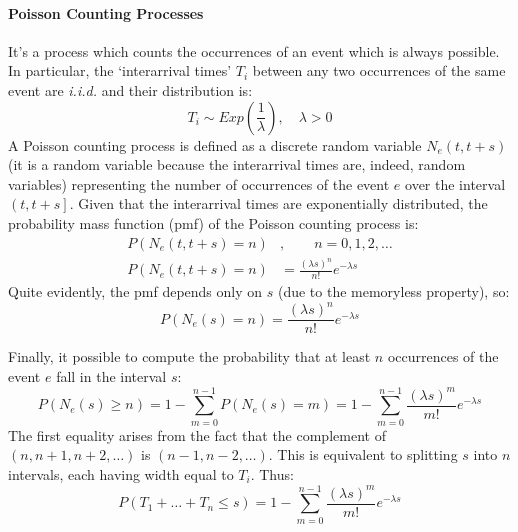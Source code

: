 \documentclass[12pt,a4paper]{article}
\begin{document}
\paragraph{Poisson Counting Processes} It's a process which counts the occurrences of an event which is always possible. In particular, the `interarrival times' $T_i$ between any two occurrences of the same event are \textit{i.i.d.} and their distribution is:
$$
T_i\sim Exp\left(\frac{1}{\lambda}\right), \quad \lambda > 0
$$
\noindent
A Poisson counting process is defined as a discrete random variable $N_e(t,t+s)$ (it is a random variable because the interarrival times are, indeed, random variables) representing the number of occurrences of the event $e$ over the interval $\left( t,t+s\right]$. Given that the interarrival times are exponentially distributed, the probability mass function (pmf) of the Poisson counting process is:
\begin{equation*}
\begin{split}
P\left(N_e(t,t+s)=n\right)&, \qquad n = 0,1,2,\dots \\
P\left(N_e(t,t+s)=n\right)& = \frac{(\lambda s)^n}{n!}e^{-\lambda s}
\end{split}
\end{equation*}
Quite evidently, the pmf depends only on $s$ (due to the memoryless property), so:
\begin{equation}
\label{eq:poissonCountingDef}
P\left(N_e(s)=n\right) = \frac{(\lambda s)^n}{n!}e^{-\lambda s}
\end{equation}

\noindent
Finally, it possible to compute the probability that at least $n$ occurrences of the event $e$ fall in the interval $s$:
$$
P\left(N_e(s) \geq n\right) = 1 - \sum_{m=0}^{n-1}P\left(N_e(s) = m \right) = 1 - \sum_{m=0}^{n-1} \frac{(\lambda s)^m}{m!}e^{-\lambda s}
$$
The first equality arises from the fact that the complement of $(n,n+1,n+2,\dots)$ is $(n-1,n-2,\dots)$. This is equivalent to splitting $s$ into $n$ intervals, each having width equal to $T_i$. Thus:
$$
P(T_1 + \dots + T_n \leq s) = 1 - \sum_{m=0}^{n-1} \frac{(\lambda s)^m}{m!}e^{-\lambda s}
$$
\end{document}
